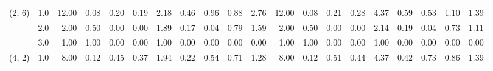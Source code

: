 \begin{tabular}{llrrrrrrrrrrrrrrrrrr}
(2, 6) & 1.0 &              12.00 &                     0.08 &                                 0.20 &                             0.19 &                           2.18 &                                               0.46 &                                            0.96 &                                            0.88 &                                        2.76 &              12.00 &                     0.08 &                                 0.21 &                             0.28 &                           4.37 &                                               0.59 &                                            0.53 &                                            1.10 &                                        1.39 \\
       & 2.0 &               2.00 &                     0.50 &                                 0.00 &                             0.00 &                           1.89 &                                               0.17 &                                            0.04 &                                            0.79 &                                        1.59 &               2.00 &                     0.50 &                                 0.00 &                             0.00 &                           2.14 &                                               0.19 &                                            0.04 &                                            0.73 &                                        1.11 \\
       & 3.0 &               1.00 &                     1.00 &                                 0.00 &                             0.00 &                           1.00 &                                               0.00 &                                            0.00 &                                            0.00 &                                        0.00 &               1.00 &                     1.00 &                                 0.00 &                             0.00 &                           1.00 &                                               0.00 &                                            0.00 &                                            0.00 &                                        0.00 \\
(4, 2) & 1.0 &               8.00 &                     0.12 &                                 0.45 &                             0.37 &                           1.94 &                                               0.22 &                                            0.54 &                                            0.71 &                                        1.28 &               8.00 &                     0.12 &                                 0.51 &                             0.44 &                           4.37 &                                               0.42 &                                            0.73 &                                            0.86 &                                        1.39 \\

\end{tabular}
